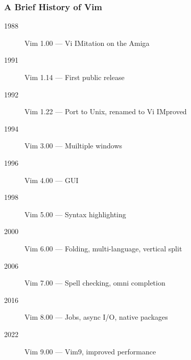 \begin{frame}[fragile]
  \frametitle{A Brief History of Vim}
  \begin{description}
    \item[1988] Vim 1.00 --- Vi IMitation on the Amiga
    \item[1991] Vim 1.14 --- First public release
    \item[1992] Vim 1.22 --- Port to Unix, renamed to Vi IMproved
    \item[1994] Vim 3.00 --- Muiltiple windows
    \item[1996] Vim 4.00 --- GUI
    \item[1998] Vim 5.00 --- Syntax highlighting
    \item[2000] Vim 6.00 --- Folding, multi-language, vertical split
    \item[2006] Vim 7.00 --- Spell checking, omni completion
    \item[2016] Vim 8.00 --- Jobs, async I/O, native packages
    \item[2022] Vim 9.00 --- Vim9, improved performance
  \end{description}
\end{frame}
